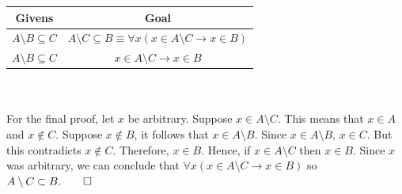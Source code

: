 \documentclass[../setup.tex]{subfiles}
\begin{document}
\begin{center}
	\begin{tabular}[t]{| c | c |}
		\hline
		Givens  & Goal  \\
		\hline
		$A \setminus B \subseteq C$ & $A \setminus C \subseteq B \equiv \forall{x}(x \in A \setminus C \rightarrow x \in B)$ \\
		\hline
		$A \setminus B \subseteq C$ & $x \in A \setminus C \rightarrow x \in B$ \\
		\hline
	\end{tabular}
\end{center}
\phantom \\ \\
For the final proof, let $x$ be arbitrary. Suppose $x \in A \setminus C$. This means that $x \in A$ and $x \notin C$. Suppose $x \notin B$, it follows that $x \in A \setminus B$. Since $x \in A \setminus B$, $x \in C$. But this contradicts $x \notin C$. Therefore, $x \in B$. Hence, if $x \in A \setminus C$ then $x \in B$. Since $x$ was arbitrary, we can conclude that $\forall{x}(x \in A \setminus C \rightarrow x \in B)$ so $A \setminus C \subset B. \qed$
\phantom \\ \\
\end{document}
